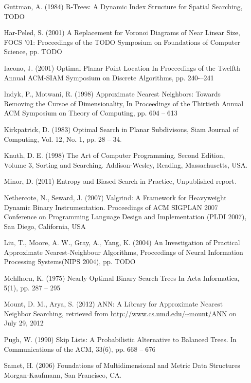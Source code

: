\documentclass[mcs]{scsthesis}
\begin{document}
\begin{thebibliography}{5}
Guttman, A. (1984) R-Trees: A Dynamic Index Structure for Spatial Searching,
TODO 

Har-Peled, S. (2001) A Replacement for Voronoi Diagrams of Near Linear Size, 
FOCS '01: Proceedings of the TODO Symposium on Foundations of Computer Science, 
pp. TODO

Iacono, J. (2001) Optimal Planar Point Location
In Proceedings of the Twelfth Annual ACM-SIAM Symposium on Discrete Algorithms,
pp. 240-–241

Indyk, P., Motwani, R. (1998) Approximate Nearest Neighbors: Towards Removing
the Cursoe of Dimensionality, In Proceedings of the Thirtieth Annual ACM
Symposium on Theory of Computing, pp. 604 -- 613 

Kirkpatrick, D. (1983) Optimal Search in Planar Subdivisons,
Siam Journal of Computing, Vol. 12, No. 1, pp. 28 -- 34.

Knuth, D. E. (1998) The Art of Computer Programming, Second Edition,
Volume 3, Sorting and Searching.  Addison-Wesley, Reading, Massachusetts, USA.

Minor, D. (2011) Entropy and Biased Search in Practice, Unpublished report.

Nethercote, N., Seward, J. (2007) Valgrind: A Framework for Heavyweight Dynamic
Binary Instrumentation.  Proceedings of ACM SIGPLAN 2007 Conference on
Programming Language Design and Implementation (PLDI 2007),
San Diego, California, USA 

Liu, T., Moore, A. W., Gray, A., Yang, K. (2004) An Investigation of Practical
Approximate Nearest-Neighbour Algorithms, Proceedings of Neural Information
Processing Systems(NIPS 2004), pp. TODO  

Mehlhorn, K. (1975) Nearly Optimal Binary Search Trees 
In Acta Informatica, 5(1), pp. 287 – 295

Mount, D. M., Arya, S. (2012) ANN: A Library for Approximate Nearest Neighbor
Searching, retrieved from \url{http://www.cs.umd.edu/~mount/ANN} on July 29, 2012 

Pugh, W. (1990) Skip Lists: A Probabilistic Alternative to Balanced Trees.
In Communications of the ACM, 33(6), pp. 668 – 676

Samet, H. (2006) Foundations of Multidimensional and Metric Data Structures
Morgan-Kaufmann, San Francisco, CA.


\end{thebibliography}
\end{document}
